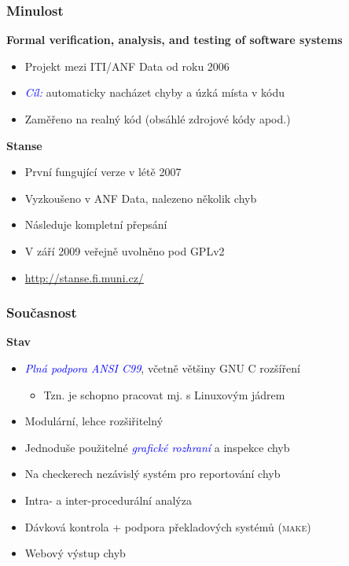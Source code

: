 \documentclass[handout,xcolor=dvipsnames]{beamer}
\let\Oldemph\emph
\renewcommand{\emph}[1]{\textcolor{blue}{\Oldemph{#1}}}
\newcommand{\heading}[1]{\textbf{\textcolor{BurntOrange}{#1}}}
\begin{document}
\begin{frame}
  \frametitle{Minulost}
  \heading{Formal verification, analysis, and testing of software
      systems}
  \begin{itemize}
  \item Projekt mezi ITI/ANF Data od roku 2006
  \item \emph{Cíl:} automaticky nacházet chyby a úzká místa v kódu
  \item Zaměřeno na realný kód (obsáhlé zdrojové kódy apod.)
  \end{itemize}

  \pause
  \medskip

  \heading{Stanse}
  \begin{itemize}
  \item První fungující verze v létě 2007
  \item Vyzkoušeno v ANF Data, nalezeno několik chyb
  \item Následuje kompletní přepsání
  \item V září 2009 veřejně uvolněno pod GPLv2
  \item \url{http://stanse.fi.muni.cz/}
  \end{itemize}

\end{frame}

\begin{frame}
  \frametitle{Současnost}

  \heading{Stav}
  \begin{itemize}
  \item \emph{Plná podpora ANSI C99}, včetně většiny GNU C rozšíření
    \begin{itemize}
    \item Tzn. je schopno pracovat mj. s Linuxovým jádrem
    \end{itemize}
  \item Modulární, lehce rozšiřitelný
  \item Jednoduše použitelné \emph{grafické rozhraní} a inspekce chyb
  \item Na checkerech nezávislý systém pro reportování chyb
  \item Intra- a inter-procedurální analýza
  \item Dávková kontrola + podpora překladových systémů (\textsc{make})
  \item Webový výstup chyb
  \end{itemize}
\end{frame}
\end{document}

